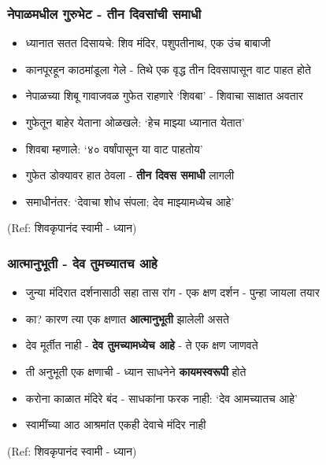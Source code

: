 \begin{frame}[fragile]\frametitle{नेपाळमधील गुरुभेट - तीन दिवसांची समाधी}

	\begin{itemize}
	\item ध्यानात सतत दिसायचे: शिव मंदिर, पशुपतीनाथ, एक उंच बाबाजी
	\item कानपूरहून काठमांडूला गेले - तिथे एक वृद्ध तीन दिवसापासून वाट पाहत होते
	\item नेपाळच्या शिबू गावाजवळ गुफेत राहणारे `शिवबा' - शिवाचा साक्षात अवतार
	\item गुफेतून बाहेर येताना ओळखले: `हेच माझ्या ध्यानात येतात'
	\item शिवबा म्हणाले: `४० वर्षांपासून या वाट पाहतोय'
	\item गुफेत डोक्यावर हात ठेवला - \textbf{तीन दिवस समाधी} लागली
	\item समाधीनंतर: `देवाचा शोध संपला; देव माझ्यामध्येच आहे'
	\end{itemize}

{\tiny (Ref: शिवकृपानंद स्वामी - ध्यान)}

\end{frame}

\begin{frame}[fragile]\frametitle{आत्मानुभूती - देव तुमच्यातच आहे}

	\begin{itemize}
	\item जुन्या मंदिरात दर्शनासाठी सहा तास रांग - एक क्षण दर्शन - पुन्हा जायला तयार
	\item का? कारण त्या एक क्षणात \textbf{आत्मानुभूती} झालेली असते
	\item देव मूर्तीत नाही - \textbf{देव तुमच्यामध्येच आहे} - ते एक क्षण जाणवते
	\item ती अनुभूती एक क्षणाची - ध्यान साधनेने \textbf{कायमस्वरूपी} होते
	\item करोना काळात मंदिरे बंद - साधकांना फरक नाही: `देव आमच्यातच आहे'
	\item स्वामींच्या आठ आश्रमांत एकही देवाचे मंदिर नाही
	\end{itemize}

{\tiny (Ref: शिवकृपानंद स्वामी - ध्यान)}

\end{frame}

